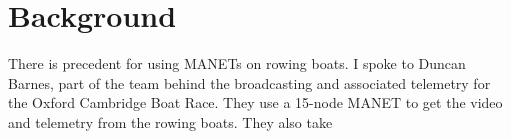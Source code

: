 \documentclass[12pt,a4paper]{report}
\begin{document}
\section{Background}
There is precedent for using MANETs on rowing boats. I spoke to Duncan Barnes, part of the team behind the broadcasting and associated telemetry for the Oxford Cambridge Boat Race. They use a 15-node MANET to get the video and telemetry from the rowing boats. They also take
\end{document}

